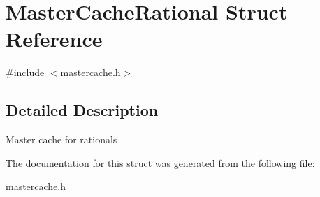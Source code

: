 \hypertarget{structMasterCacheRational}{}\section{Master\+Cache\+Rational Struct Reference}
\label{structMasterCacheRational}


{\ttfamily \#include $<$mastercache.\+h$>$}



\subsection{Detailed Description}
Master cache for rationals 

The documentation for this struct was generated from the following file\+:\begin{DoxyCompactItemize}
\item 
\hyperlink{mastercache_8h}{mastercache.\+h}\end{DoxyCompactItemize}

